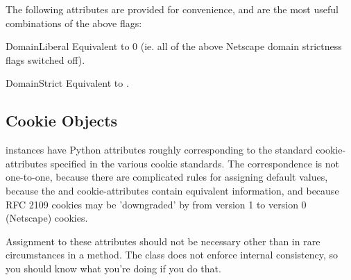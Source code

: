 The following attributes are provided for convenience, and are the
most useful combinations of the above flags:

\begin{memberdesc}{DomainLiberal}
Equivalent to 0 (ie. all of the above Netscape domain strictness flags
switched off).
\end{memberdesc}
\begin{memberdesc}{DomainStrict}
Equivalent to .
\end{memberdesc}


\subsection{Cookie Objects \label{cookie-jar-objects}}

 instances have Python attributes roughly corresponding
to the standard cookie-attributes specified in the various cookie
standards.  The correspondence is not one-to-one, because there are
complicated rules for assigning default values, because the
 and  cookie-attributes contain equivalent
information, and because RFC 2109 cookies may be 'downgraded' by
 from version 1 to version 0 (Netscape) cookies.

Assignment to these attributes should not be necessary other than in
rare circumstances in a  method.  The class does
not enforce internal consistency, so you should know what you're
doing if you do that.

